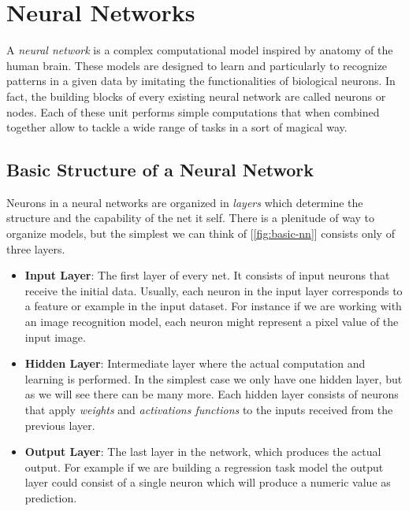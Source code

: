 \documentclass[../Thesis.tex]{subfiles}
\begin{document}
	
	\section{Neural Networks}
	\label{sec:neural_networks}
	
	A \emph{neural network} is a complex computational model inspired by anatomy of the human brain. These models are designed to learn and particularly to recognize patterns in a given data by imitating the functionalities of biological neurons. In fact, the building blocks of every existing neural network are called neurons or nodes. Each of these unit performs simple computations that when combined together allow to tackle a wide range of tasks in a sort of magical way.
	
	\subsection{Basic Structure of a Neural Network}
	
	Neurons in a neural networks are organized in \emph{layers} which determine the structure and the capability of the net it self. There is a plenitude of way to organize models, but the simplest we can think of [\autoref{fig:basic-nn}] consists only of three layers.
	
	\begin{itemize}
		\item \textbf{Input Layer}: The first layer of every net. It consists of input neurons that receive the initial data. Usually, each neuron in the input layer corresponds to a feature or example in the input dataset. For instance if we are working with an image recognition model, each neuron might represent a pixel value of the input image.
		
		\item \textbf{Hidden Layer}: Intermediate layer where the actual computation and learning is performed. In the simplest case we only have one hidden layer, but as we will see there can be many more. Each hidden layer consists of neurons that apply \emph{weights} and \emph{activations functions} to the inputs received from the previous layer.
		
		\item \textbf{Output Layer}: The last layer in the network, which produces the actual output. For example if we are building a regression task model the output layer could consist of a single neuron which will produce a numeric value as prediction.
	\end{itemize}
	
\end{document}
